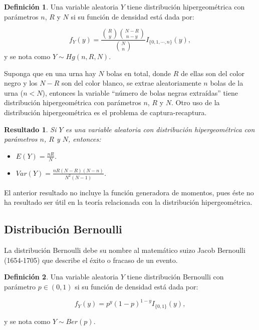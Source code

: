 \documentclass[
  10pt,
  spanish,
]{book}
\providecommand{\tightlist}{%
  \setlength{\itemsep}{0pt}\setlength{\parskip}{0pt}}
\newtheorem{proposition}{Resultado}[chapter]
\theoremstyle{definition}
\newtheorem{definition}{Definición}[chapter]
\theoremstyle{definition}
\theoremstyle{definition}
\theoremstyle{definition}
\theoremstyle{remark}
\begin{document}
\begin{definition}
\protect\hypertarget{def:unnamed-chunk-3}{}{\label{def:unnamed-chunk-3} }Una variable aleatoria \(Y\) tiene distribución hipergeométrica con parámetros \(n\), \(R\) y \(N\) si su función de densidad está dada por:

\begin{equation}
f_Y(y)=\frac{\binom{R}{y}\binom{N-R}{n-y}}{\binom{N}{n}}I_{\{0,1,\cdots,n\}}(y),
\end{equation}
y se nota como \(Y\sim Hg(n,R,N)\).
\end{definition}

Suponga que en una urna hay \(N\) bolas en total, donde \(R\) de ellas son del color negro y los \(N-R\) son del color blanco, se extrae aleatoriamente
\(n\) bolas de la urna (\(n<N\)), entonces la variable ``número de bolas negras extraídas'' tiene distribución hipergeométrica con parámetros \(n\), \(R\) y
\(N\). Otro uso de la distribución hipergeométrica es el problema de captura-recaptura.

\begin{proposition}
\protect\hypertarget{prp:unnamed-chunk-4}{}{\label{prp:unnamed-chunk-4} }Si \(Y\) es una variable aleatoria con distribución hipergeométrica con parámetros \(n\), \(R\) y \(N\), entonces:

\begin{itemize}
\tightlist
\item
  \(E(Y)=\frac{nR}{N}\).
\item
  \(Var(Y)=\frac{nR(N-R)(N-n)}{N^2(N-1)}\).
\end{itemize}
\end{proposition}

El anterior resultado no incluye la función generadora de momentos, pues éste no ha resultado ser útil en la teoría relacionada con la distribución hipergeométrica.

\hypertarget{distribuciuxf3n-bernoulli}{%
\subsection{Distribución Bernoulli}\label{distribuciuxf3n-bernoulli}}

La distribución Bernoulli debe su nombre al matemático suizo Jacob Bernoulli (1654-1705) que describe el éxito o fracaso de un evento.

\begin{definition}
\protect\hypertarget{def:unnamed-chunk-5}{}{\label{def:unnamed-chunk-5} }Una variable aleatoria \(Y\) tiene distribución Bernoulli con parámetro \(p\in (0,1)\) si su función de densidad está dada por:

\begin{equation}
f_Y(y)=p^y(1-p)^{1-y}I_{\{0,1\}}(y),
\end{equation}

y se nota como \(Y\sim Ber(p)\).
\end{definition}
\end{document}
